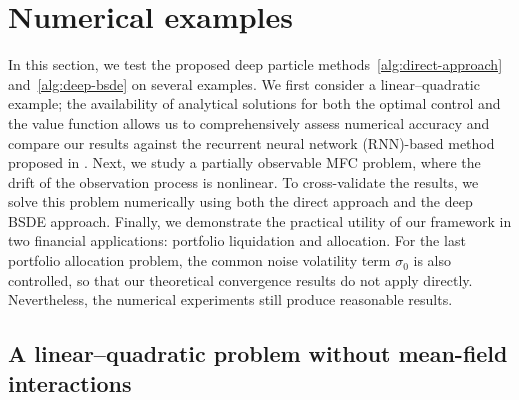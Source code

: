 \documentclass[11pt]{article}
\numberwithin{equation}{section}
\theoremstyle{plain}
\theoremstyle{definition}
\theoremstyle{remark}
\begin{document}
	
	\section{Numerical examples} \label{sec:numerical-experiments}
	
	In this section, we test the proposed deep particle methods~\ref{alg:direct-approach} and~\ref{alg:deep-bsde} on several examples. We first consider a linear--quadratic example; the availability of analytical solutions for both the optimal control and the value function allows us to comprehensively assess numerical accuracy and compare our results against the recurrent neural network (RNN)-based method proposed in \cite{han2021recurrent}. Next, we study a partially observable MFC problem, where the drift of the observation process is nonlinear. To cross-validate the results, we solve this problem numerically using both the direct approach and the deep BSDE approach. Finally, we demonstrate the practical utility of our framework in two financial applications: portfolio liquidation and allocation. 
	For the last portfolio allocation problem, the common noise volatility term $\sigma_0$ is also controlled, so that our theoretical convergence results do not apply directly.
	Nevertheless, the numerical experiments still produce reasonable results. 
	
\subsection{A linear--quadratic problem without mean-field interactions}
\label{subsec:linear_quad}
	
\end{document}
